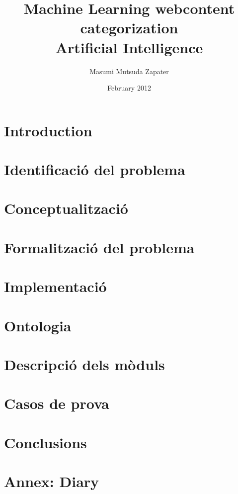\documentclass[a4paper , titlepage]{report}
\author{Masumi Mutsuda Zapater}
\title{Machine Learning webcontent categorization \\ Artificial Intelligence}
\date{February 2012}
\begin{document}
\maketitle



\tableofcontents

\newpage

\chapter{Introduction}
%

\chapter{Identificació del problema}
%

\chapter{Conceptualització}
%

\chapter{Formalització del problema}
%

\chapter{Implementació}
%

\chapter{Ontologia}
%


\chapter{Descripció dels mòduls}
%

\chapter{Casos de prova}
%

\chapter{Conclusions}
%



\chapter{Annex: Diary }

\end{document}
